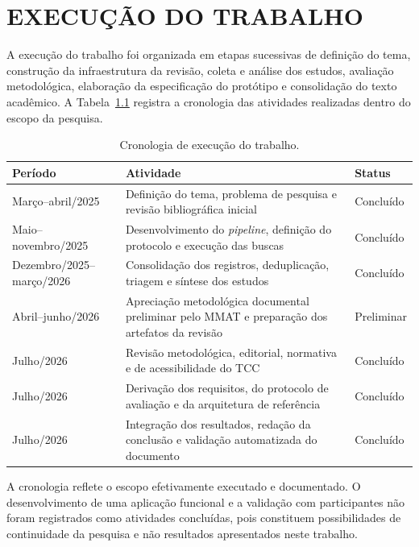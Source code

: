 \chapter{EXECUÇÃO DO TRABALHO}
\label{cap:cronograma}

A execução do trabalho foi organizada em etapas sucessivas de definição do tema, construção da infraestrutura da revisão, coleta e análise dos estudos, avaliação metodológica, elaboração da especificação do protótipo e consolidação do texto acadêmico. A Tabela~\ref{tab:cronograma} registra a cronologia das atividades realizadas dentro do escopo da pesquisa.

\begin{table}[htbp]
\centering
\caption{Cronologia de execução do trabalho.}
\label{tab:cronograma}
\small
\begin{tabular}{p{3.0cm}p{8.0cm}p{2.5cm}}
\hline
\textbf{Período} & \textbf{Atividade} & \textbf{Status} \\
\hline
Março--abril/2025 & Definição do tema, problema de pesquisa e revisão bibliográfica inicial & Concluído \\
Maio--novembro/2025 & Desenvolvimento do \textit{pipeline}, definição do protocolo e execução das buscas & Concluído \\
Dezembro/2025--março/2026 & Consolidação dos registros, deduplicação, triagem e síntese dos estudos & Concluído \\
Abril--junho/2026 & Apreciação metodológica documental preliminar pelo MMAT e preparação dos artefatos da revisão & Preliminar \\
Julho/2026 & Revisão metodológica, editorial, normativa e de acessibilidade do TCC & Concluído \\
Julho/2026 & Derivação dos requisitos, do protocolo de avaliação e da arquitetura de referência & Concluído \\
Julho/2026 & Integração dos resultados, redação da conclusão e validação automatizada do documento & Concluído \\
\hline
\end{tabular}
\end{table}

A cronologia reflete o escopo efetivamente executado e documentado. O desenvolvimento de uma aplicação funcional e a validação com participantes não foram registrados como atividades concluídas, pois constituem possibilidades de continuidade da pesquisa e não resultados apresentados neste trabalho.

